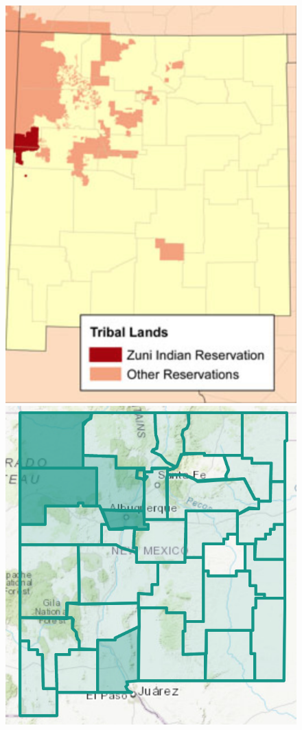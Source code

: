 \documentclass{article}
\begin{document}
{\begin{figure}
\centering
\includegraphics[scale=.75]{navajo_nation_nm}
\includegraphics[scale=.75]{nn_covid}

\end{figure}}
\end{document}
